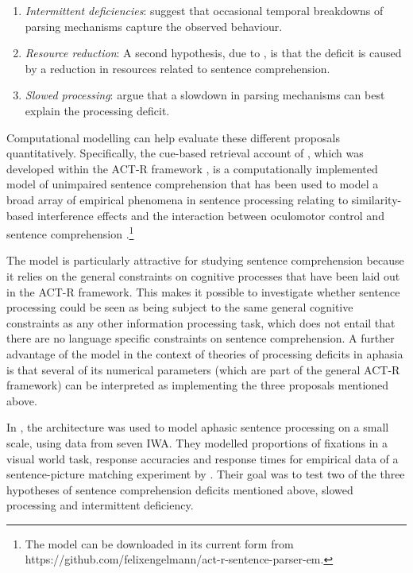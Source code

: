 \documentclass[10pt,letterpaper]{article}
\begin{document}
\begin{enumerate}
  \item \textit{Intermittent deficiencies}:
   suggest that occasional temporal breakdowns of parsing mechanisms capture the observed behaviour. 
  \item \textit{Resource reduction}:
  A second hypothesis, due to ,  is that the deficit is caused by a reduction in resources related to sentence comprehension. 
  \item \textit{Slowed processing}:
   argue that a slowdown in parsing mechanisms can best explain the processing deficit.  
\end{enumerate} 

Computational modelling can help evaluate these different proposals quantitatively. 
Specifically, the cue-based retrieval account of , which was developed within the ACT-R framework \cite{AndersonEtAl2004}, is a computationally implemented model of unimpaired sentence comprehension 
 that has been used to model a broad array of empirical phenomena in sentence processing relating to similarity-based interference effects 
\cite{LewisVasishth2005,NicenboimVasishth2017StanCon,VBLD07,EngelmannJaegerVasishthSubmitted2016} and the interaction between oculomotor control and  sentence comprehension \cite{Engelmanna}.\footnote{The model can be downloaded in its current form from 
https://github.com/felixengelmann/act-r-sentence-parser-em.}

The  model is particularly attractive for studying sentence comprehension because it relies on the general constraints on cognitive processes that have been laid out in the ACT-R framework. This makes it possible to investigate whether sentence processing could be seen as being subject to the same general cognitive constraints as  any other information processing task, which does not entail that there are no language specific constraints on sentence comprehension.
A further advantage of the  model in the context of theories of processing deficits in aphasia is that several of its numerical parameters (which are part of the general ACT-R framework) can be interpreted as  implementing the three proposals mentioned above.

In , the  architecture was used to model aphasic sentence processing on a small scale, using data from seven IWA. 
They modelled proportions of fixations in a visual world task, response accuracies and response times for empirical data of a sentence-picture matching experiment by . Their goal was to test two of the three hypotheses of sentence comprehension deficits mentioned above, slowed processing and intermittent deficiency.  
\end{document}
